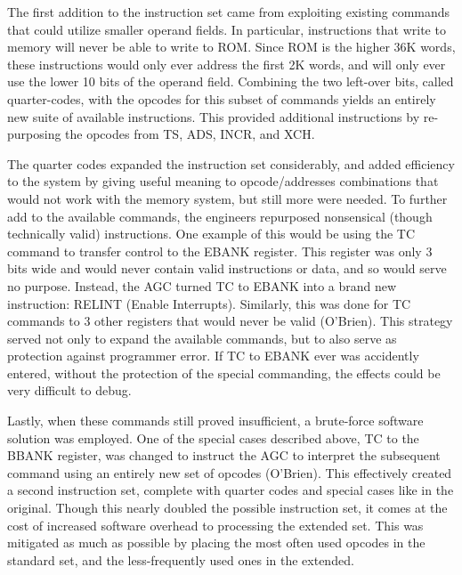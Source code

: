 \documentclass[a4paper,11pt]{article}
\begin{document}
The first addition to the instruction set came from exploiting existing commands that could utilize smaller operand fields.  In particular, instructions that write to memory will never be able to write to ROM. Since ROM is the higher 36K words, these instructions would only ever address the first 2K words, and will only ever use the lower 10 bits of the operand field. Combining the two left-over bits, called quarter-codes, with the opcodes for this subset of commands yields an entirely new suite of available instructions.  This provided additional instructions by re-purposing the opcodes from TS, ADS, INCR, and XCH.

The quarter codes expanded the instruction set considerably, and added efficiency to the system by giving useful meaning to opcode/addresses combinations that would not work with the memory system, but still more were needed.  To further add to the available commands, the engineers repurposed nonsensical (though technically valid) instructions.  One example of this would be using the TC command to transfer control to the EBANK register.  This register was only 3 bits wide and would never contain valid instructions or data, and so would serve no purpose.  Instead, the AGC turned TC to EBANK into a brand new instruction: RELINT (Enable Interrupts).  Similarly, this was done for TC commands to 3 other registers that would never be valid (O'Brien).  This strategy served not only to expand the available commands, but to also serve as protection against programmer error.  If TC to EBANK ever was accidently entered, without the protection of the special commanding, the effects could be very difficult to debug.

Lastly, when these commands still proved insufficient, a brute-force software solution was employed.  One of the special cases described above, TC to the BBANK register, was changed to instruct the AGC to interpret the subsequent command using an entirely new set of opcodes (O'Brien).  This effectively created a second instruction set, complete with quarter codes and special cases like in the original.  Though this nearly doubled the possible instruction set, it comes at the cost of increased software overhead to processing the extended set.  This was mitigated as much as possible by placing the most often used opcodes in the standard set, and the less-frequently used ones in the extended.
\end{document}
